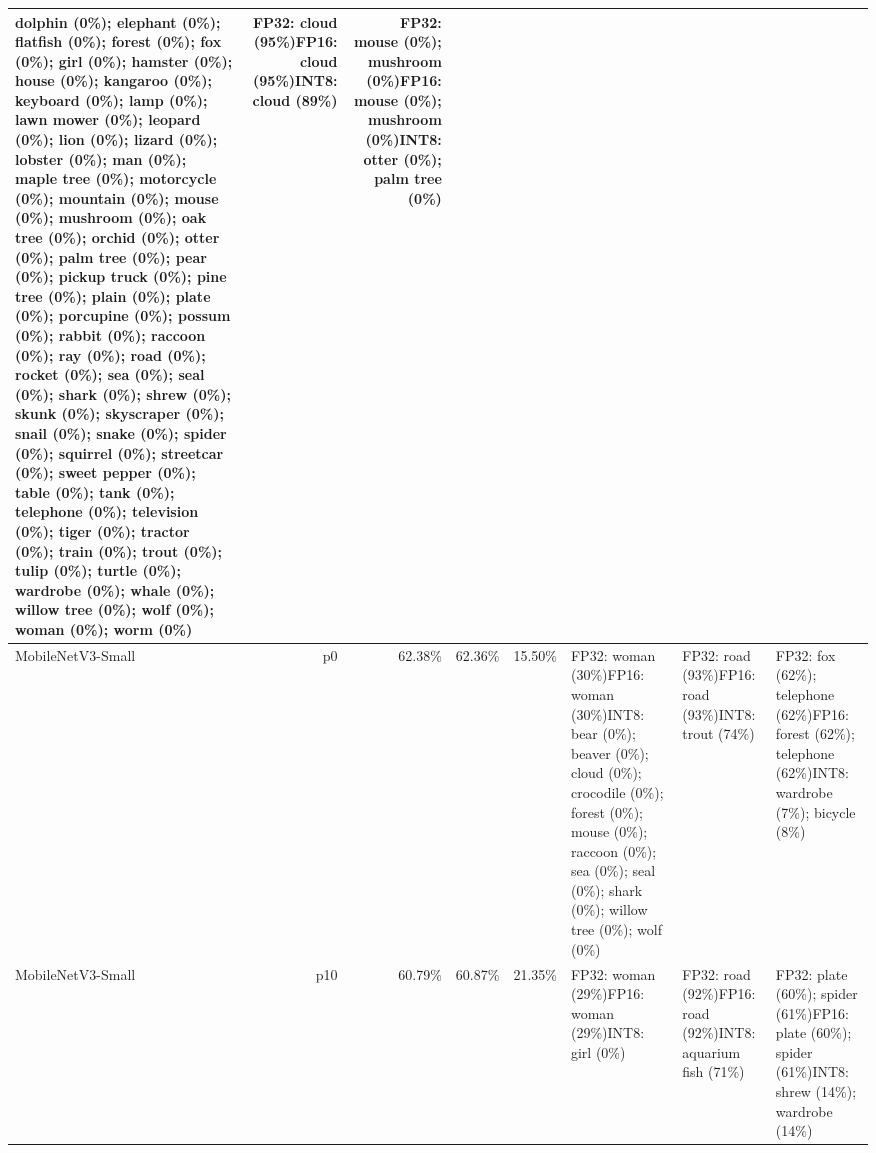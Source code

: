 \begin{longtable}{p{2.8cm} r r r r p{5.0cm} p{4.2cm} p{4.2cm}}
dolphin (0\%); elephant (0\%); flatfish (0\%); forest (0\%); fox (0\%); girl (0\%); hamster (0\%); house (0\%); kangaroo (0\%); keyboard (0\%); lamp (0\%); lawn mower (0\%); leopard (0\%); lion (0\%); lizard (0\%); lobster (0\%); man (0\%); maple tree (0\%); motorcycle (0\%); mountain (0\%); mouse (0\%); mushroom (0\%); oak tree (0\%); orchid (0\%); otter (0\%); palm tree (0\%); pear (0\%); pickup truck (0\%); pine tree (0\%); plain (0\%); plate (0\%); porcupine (0\%); possum (0\%); rabbit (0\%); raccoon (0\%); ray (0\%); road (0\%); rocket (0\%); sea (0\%); seal (0\%); shark (0\%); shrew (0\%); skunk (0\%); skyscraper (0\%); snail (0\%); snake (0\%); spider (0\%); squirrel (0\%); streetcar (0\%); sweet pepper (0\%); table (0\%); tank (0\%); telephone (0\%); television (0\%); tiger (0\%); tractor (0\%); train (0\%); trout (0\%); tulip (0\%); turtle (0\%); wardrobe (0\%); whale (0\%); willow tree (0\%); wolf (0\%); woman (0\%); worm (0\%) & FP32: cloud (95\%)\newline FP16: cloud (95\%)\newline INT8: cloud (89\%) & FP32: mouse (0\%); mushroom (0\%)\newline FP16: mouse (0\%); mushroom (0\%)\newline INT8: otter (0\%); palm tree (0\%) \\ \hline
MobileNetV3-Small & p0 & 62.38\% & 62.36\% & 15.50\% & FP32: woman (30\%)\newline FP16: woman (30\%)\newline INT8: bear (0\%); beaver (0\%); cloud (0\%); crocodile (0\%); forest (0\%); mouse (0\%); raccoon (0\%); sea (0\%); seal (0\%); shark (0\%); willow tree (0\%); wolf (0\%) & FP32: road (93\%)\newline FP16: road (93\%)\newline INT8: trout (74\%) & FP32: fox (62\%); telephone (62\%)\newline FP16: forest (62\%); telephone (62\%)\newline INT8: wardrobe (7\%); bicycle (8\%) \\ \hline
MobileNetV3-Small & p10 & 60.79\% & 60.87\% & 21.35\% & FP32: woman (29\%)\newline FP16: woman (29\%)\newline INT8: girl (0\%) & FP32: road (92\%)\newline FP16: road (92\%)\newline INT8: aquarium fish (71\%) & FP32: plate (60\%); spider (61\%)\newline FP16: plate (60\%); spider (61\%)\newline INT8: shrew (14\%); wardrobe (14\%) \\ \hline

\end{longtable}
